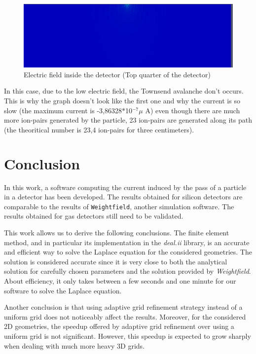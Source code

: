\documentclass[11pt]{article}
\begin{document}
				\begin{figure}[H]
				  \center
				  \includegraphics[scale=0.4]{images/applications/electric_field.png}
				  \caption{Electric field inside the detector (Top quarter of the detector)}
				  \label{fig:electric_field}
				\end{figure}

				In this case, due to the low electric field, the Townsend avalanche don't occurs. This is why the graph doesn't
				look like the first one and why the current is so slow (the maximum current is -3,86328$*$10$^{-7}\mu$ A) even though
				there are much more ion-pairs generated by the particle, 23 ion-pairs are generated along its path (the theoritical
				number is 23,4 ion-pairs for three centimeters).

\section*{Conclusion}

	In this work, a software computing the current induced by the pass of a
	particle in a detector has been developed. The results obtained for silicon
	detectors are comparable to the results of \texttt{Weightfield},
	another simulation software. The results obtained for gas detectors still
	need to be validated.

	This work allows us to derive the following conclusions. The finite element
	method, and in particular its implementation in the \textit{deal.ii} library,
	is an accurate and efficient way to solve the Laplace equation for the
	considered geometries. The solution is considered accurate since it is
	very close to both the analytical solution for carefully chosen parameters and
	the solution provided by \textit{Weightfield}. About efficiency, it only takes between a few seconds
	and one minute for our software to solve the Laplace equation.

  Another conclusion is that using adaptive grid refinement strategy instead
	of a uniform grid does not noticeably affect the results. Moreover, for the
	considered 2D geometries, the speedup offered by adaptive grid refinement over
	using a uniform grid is not significant. However, this speedup is expected
	to grow sharply when dealing with much more heavy 3D grids.
\end{document}
